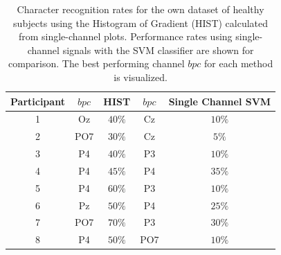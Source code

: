 \documentclass[utf8]{frontiersSCNS} %
\begin{document}

\begin{table}[htb]
\caption{Character recognition rates for the own dataset of healthy subjects using the Histogram of Gradient (HIST) calculated from  single-channel plots.  Performance rates using single-channel signals with the SVM classifier are shown for comparison.  The best performing channel $bpc$ for each method is visualized.}
\centering
\begin{tabular}{c|cc|cc}
\toprule
\textbf{Participant}	&  $bpc$	&  HIST &  $bpc$	&  Single Channel SVM \\
\midrule
1     &     Oz   &   $40\%$  &  Cz   &  $10\%$    \\
2     &     PO7   &   $30\%$      &  Cz   & $5\%$   \\
3     &     P4   &   $40\%$    &  P3   & $10\%$    \\
4     &     P4 &   $45\%$    &  P4   & $35\%$     \\
5     &     P4 &   $60\%$  &  P3   & $10\%$     \\
6     &     Pz &   $50\%$ &  P4   & $25\%$     \\
7     &     PO7 &   $70\%$  &  P3   & $30\%$     \\
8     &     P4 &   $50\%$    &  PO7   & $10\%$    \\

\end{tabular}
\label{tab:resultsown}
\end{table}
\end{document}
